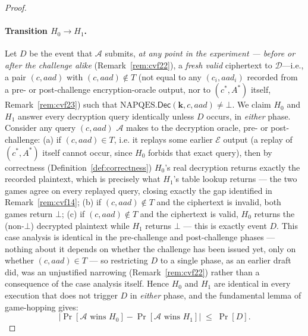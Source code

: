 \documentclass[11pt,a4paper]{article}
\begin{document}
\begin{proof}
\paragraph{Transition $H_0 \to H_1$.}
Let $D$ be the event that $\mathcal{A}$ submits, \emph{at any point in the
experiment --- before or after the challenge alike}
(Remark~\ref{rem:cvf22}), a \emph{fresh valid} ciphertext to
$\mathcal{D}$—i.e., a pair $(c, aad)$ with $(c, aad) \notin T$ (not equal
to any $(c_i, aad_i)$ recorded from a pre- or post-challenge
encryption-oracle output, nor to $(c^*,A^*)$ itself,
Remark~\ref{rem:cvf23}) such that
$\mathrm{NAPQES}.\mathsf{Dec}(\mathbf{k}, c, aad) \neq \bot$.
We claim $H_0$ and $H_1$ answer every decryption query identically unless
$D$ occurs, in \emph{either} phase. Consider any query $(c, aad)$
$\mathcal{A}$ makes to the decryption oracle, pre- or post-challenge: (a)
if $(c, aad) \in T$, i.e. it replays some earlier $\mathcal{E}$ output
(a replay of $(c^*,A^*)$ itself cannot occur, since $H_0$ forbids that
exact query), then by correctness (Definition~\ref{def:correctness})
$H_0$'s real decryption returns exactly the recorded plaintext, which is
precisely what $H_1$'s table lookup returns --- the two games agree on
every replayed query, closing exactly the gap identified in
Remark~\ref{rem:cvf14}; (b) if $(c, aad) \notin T$ and the ciphertext is
invalid, both games return $\bot$; (c) if $(c, aad) \notin T$ and the
ciphertext is valid, $H_0$ returns the (non-$\bot$) decrypted plaintext
while $H_1$ returns $\bot$ --- this is exactly event $D$. This case
analysis is identical in the pre-challenge and post-challenge phases ---
nothing about it depends on whether the challenge has been issued yet,
only on whether $(c,aad)\in T$ --- so restricting $D$ to a single phase,
as an earlier draft did, was an unjustified narrowing
(Remark~\ref{rem:cvf22}) rather than a consequence of the case analysis
itself. Hence $H_0$ and $H_1$ are identical in every execution that does
not trigger $D$ in \emph{either} phase, and the fundamental lemma of
game-hopping gives:
\[
  \bigl|\Pr[\mathcal{A}\text{ wins }H_0] - \Pr[\mathcal{A}\text{ wins }H_1]\bigr|
  \;\leq\; \Pr[D].
\]


\end{proof}
\end{document}
